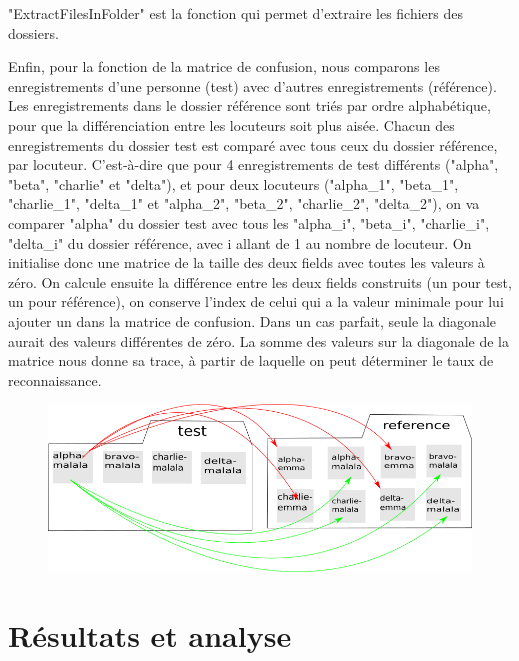 \documentclass[a4paper,12pt]{article}
\begin{document}
"ExtractFilesInFolder" est la fonction qui permet d'extraire les fichiers des dossiers.

Enfin, pour la fonction de la matrice de confusion, nous comparons les enregistrements d'une personne (test) avec d'autres enregistrements (référence). Les enregistrements dans le dossier référence sont triés par ordre alphabétique, pour que la différenciation entre les locuteurs soit plus aisée. Chacun des enregistrements du dossier test est comparé avec tous ceux du dossier référence, par locuteur. C'est-à-dire que pour 4 enregistrements de test différents ("alpha", "beta", "charlie" et "delta"), et pour deux locuteurs ("alpha\_1", "beta\_1", "charlie\_1", "delta\_1" et "alpha\_2", "beta\_2", "charlie\_2", "delta\_2"), on va comparer "alpha" du dossier test avec tous les "alpha\_i", "beta\_i", "charlie\_i", "delta\_i" du dossier référence, avec i allant de 1 au nombre de locuteur.
On initialise donc une matrice de la taille des deux fields avec toutes les valeurs à zéro. On calcule ensuite la différence entre les deux fields construits (un pour test, un pour référence), on conserve l'index de celui qui a la valeur minimale pour lui ajouter un dans la matrice de confusion. Dans un cas parfait, seule la diagonale aurait des valeurs différentes de zéro.
La somme des valeurs sur la diagonale de la matrice nous donne sa trace, à partir de laquelle on peut déterminer le taux de reconnaissance.

\begin{figure}[h]
		\includegraphics[scale=0.5]{compte-rendu.png}
	\end{figure}
	
\section{Résultats et analyse}
\end{document}
